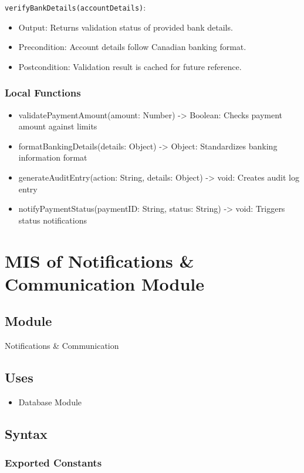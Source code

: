 \documentclass[12pt, titlepage]{article}
\begin{document}
\noindent \texttt{verifyBankDetails(accountDetails)}:
\begin{itemize}
    \item Output: Returns validation status of provided bank details.
    \item Precondition: Account details follow Canadian banking format.
    \item Postcondition: Validation result is cached for future reference.
\end{itemize}

\subsubsection{Local Functions}
\begin{itemize}
    \item validatePaymentAmount(amount: Number) -> Boolean: Checks payment amount against limits
    \item formatBankingDetails(details: Object) -> Object: Standardizes banking information format
    \item generateAuditEntry(action: String, details: Object) -> void: Creates audit log entry
    \item notifyPaymentStatus(paymentID: String, status: String) -> void: Triggers status notifications
\end{itemize}

\section{MIS of Notifications \& Communication Module}

\subsection{Module}
Notifications \& Communication

\subsection{Uses}
\begin{itemize}
    \item Database Module
\end{itemize}

\subsection{Syntax}
\subsubsection{Exported Constants}
\end{document}
